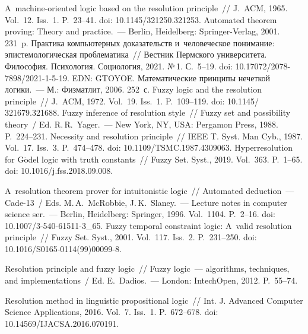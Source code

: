 \begin{multicols}{2}
{\small\frenchspacing
 {\baselineskip=11.4pt
 \begin{thebibliography}{99}
 A~machine-oriented logic based on the resolution principle~// J.~ACM, 1965. 
Vol.~12. Iss.~1. P.~23--41. doi: 10.1145/321250.321253.
 Automated theorem proving: Theory and practice.~--- Berlin, Heidelberg: 
Springer-Verlag, 2001. 231~p.
 Практика компьютерных доказательств и~человеческое понимание: 
эпистемологическая проблематика~// Вестник Пермского университета. Философия. 
Психология. Социология, 2021. №\,1. С.~5--19. doi: 10.17072/2078-7898/2021-1-5-19. 
EDN: \mbox{GTOYOE}.
 Математические принципы нечеткой  
логики.~--- М.: Физматлит, 2006. 252~с.
 Fuzzy logic and the resolution principle~// J.~ACM, 1972. Vol.~19. Iss.~1. 
P.~109--119. doi: 10.1145/ 321679.321688.
 Fuzzy inference of resolution style~// Fuzzy set and possibility theory~/ Ed. 
R.\,R.~Yager.~--- New York, NY, USA: Pergamon Press, 1988. P.~224--231.
 Necessity and resolution principle~// IEEE T. Syst. Man  
Cyb., 1987. Vol.~17. Iss.~3. P.~474--478. doi: 10.1109/TSMC.1987.4309063.
 Hyperresolution for G$\ddot{\mbox{o}}$del logic with truth constants~// Fuzzy Set. 
Syst., 2019. Vol.~363. P.~1--65. doi: 10.1016/j.fss.2018.09.008.


 A~resolution theorem prover for intuitonistic logic~// Automated deduction~--- 
Cade-13~/ Eds. M.\,A.~McRobbie, J.\,K.~Slaney.~--- Lecture notes in computer science ser.~--- 
Berlin, Heidelberg: Springer, 1996. Vol.~1104. P.~2--16. doi: 10.1007/3-540-61511-3\_65.
 Fuzzy temporal constraint logic: A~valid resolution 
principle~// Fuzzy Set. Syst., 2001. Vol.~117. Iss.~2. P.~231--250. doi:  
10.1016/S0165-0114(99)00099-8.

 Resolution principle and fuzzy logic~// Fuzzy logic~--- algorithms, techniques, 
and implementations~/ Ed. E.~Dadios.~--- London: IntechOpen, 2012. P.~55--74.

 Resolution method in linguistic propositional logic~// Int. J. 
Advanced Computer Science Applications, 2016. Vol.~7. Iss.~1. P.~672--678. doi: 
10.14569/IJACSA.2016.070191.


\end{thebibliography}}}
\end{multicols}
